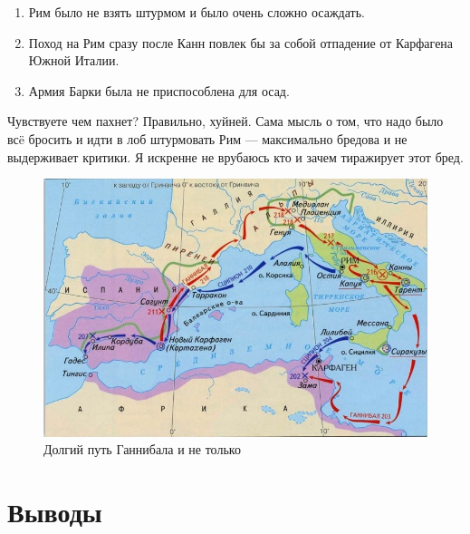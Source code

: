 \begin{enumerate}
	\item  Рим было не взять штурмом и было очень сложно осаждать.
	\item  Поход на Рим сразу после Канн повлек бы за собой отпадение от Карфагена Южной Италии.
	\item  Армия Барки была не приспособлена для осад.
\end{enumerate}



Чувствуете чем пахнет? Правильно, хуйней. Сама мысль о том, что надо было всë бросить и идти в лоб штурмовать Рим — максимально бредова и не выдерживает критики. Я искренне не врубаюсь кто и зачем тиражирует этот бред.

\begin{figure}[h!tb]
	\centering\includegraphics[scale=0.4]{Data/Hannibal_and_Rome/1622873082142334909.png}
	\caption{Долгий путь Ганнибала и не только}
	\label{fig:barka3} %
\end{figure}



\section{Выводы}


